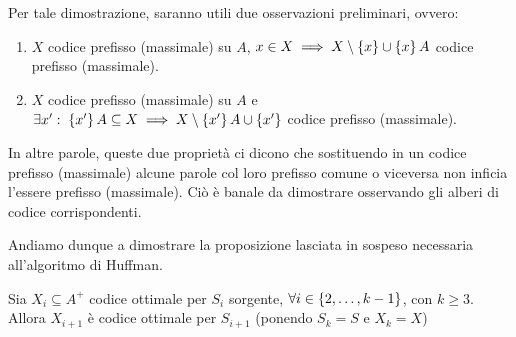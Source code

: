 Per tale dimostrazione, saranno utili due osservazioni preliminari, ovvero:
\begin{enumerate}
  \item \(X\) codice prefisso (massimale) su \(A\), \(x \in X \implies X \setminus \set{x} \cup \set{x}A\) codice prefisso (massimale).
  \item \(X\) codice prefisso (massimale) su \(A\) e \(\exists x' \st \set{x'}A \subseteq X \implies X\setminus \set{x'}A \cup \set{x'}\) codice prefisso (massimale).
\end{enumerate}

In altre parole, queste due proprietà ci dicono che sostituendo in un codice prefisso (massimale) alcune parole col loro prefisso comune o viceversa non inficia l'essere prefisso (massimale).
Ciò è banale da dimostrare osservando gli alberi di codice corrispondenti.

Andiamo dunque a dimostrare la proposizione lasciata in sospeso necessaria all'algoritmo di Huffman.

\begin{proposition}{}
  Sia \(X_i \subseteq A^+\) codice ottimale per \(S_i\) sorgente, \(\forall i \in \set{2,\ldots,k-1}\), con \(k \geq 3\).
  Allora \(X_{i+1}\) è codice ottimale per \(S_{i+1}\) (ponendo \(S_k=S\) e \(X_k = X\))
\end{proposition}

